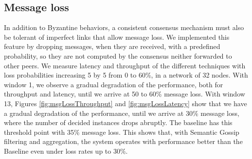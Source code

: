 \subsection{Message loss}
\label{sec:msgLoss}
In addition to Byzantine behaviors, a consistent consensus mechanism must also be tolerant of imperfect links that allow message loss. We implemented this feature by dropping messages, when they are received, with a predefined probability, so they are not computed by the consensus neither forwarded to other peers.   We measure latency and throughput of the different techniques with loss probabilities increasing 5 by 5 from 0 to 60\%, in a network of 32 nodes.   With window 1,   we observe a gradual degradation of the performance, both for throughput and latency, until we arrive at 50 to 60\% message loss.   With window 13,  
%
%
%
Figures \ref{fig:msgLossThroughput} and \ref{fig:msgLossLatency} show that we have a gradual degradation of the performance,  until we arrive at 30\% message loss, where the number of decided instances drops abruptly. The baseline has this threshold point with 35\% message loss. 
%
%
This shows that, with Semantic Gossip filtering and aggregation, the system operates with performance better than the Baseline even under loss rates up to 30\%.




	
